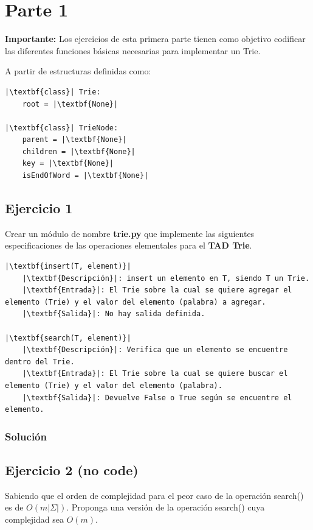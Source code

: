\documentclass{article}
\begin{document}

\section*{Parte 1}

\textbf{Importante:} Los ejercicios de esta primera parte tienen como objetivo codificar las diferentes funciones básicas necesarias para implementar un Trie.

A partir de estructuras definidas como:

\begin{lstlisting}
|\textbf{class}| Trie:
    root = |\textbf{None}|

|\textbf{class}| TrieNode:
    parent = |\textbf{None}|
    children = |\textbf{None}|
    key = |\textbf{None}|
    isEndOfWord = |\textbf{None}|
\end{lstlisting}


\subsection*{Ejercicio 1}
Crear un módulo de nombre \textbf{trie.py} que implemente las siguientes especificaciones de las operaciones elementales para el \textbf{TAD Trie}.
\begin{lstlisting}
|\textbf{insert(T, element)}|
    |\textbf{Descripción}|: insert un elemento en T, siendo T un Trie.
    |\textbf{Entrada}|: El Trie sobre la cual se quiere agregar el elemento (Trie) y el valor del elemento (palabra) a agregar.
    |\textbf{Salida}|: No hay salida definida.

|\textbf{search(T, element)}|
    |\textbf{Descripción}|: Verifica que un elemento se encuentre dentro del Trie.
    |\textbf{Entrada}|: El Trie sobre la cual se quiere buscar el elemento (Trie) y el valor del elemento (palabra).
    |\textbf{Salida}|: Devuelve False o True según se encuentre el elemento.
\end{lstlisting}
\subsubsection*{Solución}


\pagebreak
\subsection*{Ejercicio 2 (no code)}
Sabiendo que el orden de complejidad para el peor caso de la operación search() es de $O(m |\Sigma|)$. Proponga una versión de la operación search() cuya complejidad sea $O(m)$.
\end{document}
